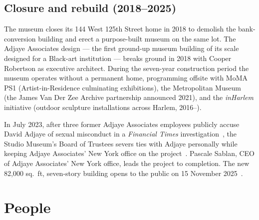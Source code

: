 \documentclass[10pt,letterpaper,twocolumn]{article}
\begin{document}
\subsection{Closure and rebuild (2018--2025)}

The museum closes its 144 West 125th Street home in 2018 to demolish the bank-conversion building and erect a purpose-built museum on the same lot. The Adjaye Associates design --- the first ground-up museum building of its scale designed for a Black-art institution --- breaks ground in 2018 with Cooper Robertson as executive architect. During the seven-year construction period the museum operates without a permanent home, programming offsite with MoMA PS1 (Artist-in-Residence culminating exhibitions), the Metropolitan Museum (the James Van Der Zee Archive partnership announced 2021), and the \emph{inHarlem} initiative (outdoor sculpture installations across Harlem, 2016--).

In July 2023, after three former Adjaye Associates employees publicly accuse David Adjaye of sexual misconduct in a \emph{Financial Times} investigation~\citep{ft2023adjaye}, the Studio Museum's Board of Trustees severs ties with Adjaye personally while keeping Adjaye Associates' New York office on the project~\citep{artnews2023adjaye}. Pascale Sablan, CEO of Adjaye Associates' New York office, leads the project to completion. The new 82{,}000 sq.~ft, seven-story building opens to the public on 15 November 2025~\citep{smh2025opening}.

\section{People}
\end{document}
